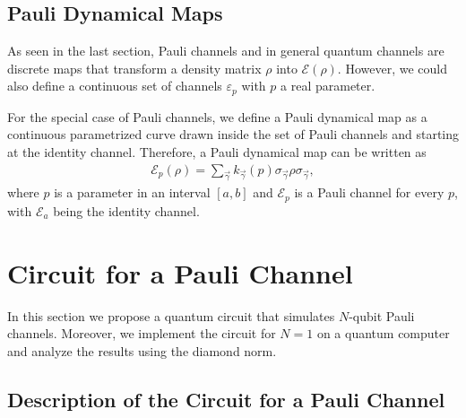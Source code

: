 \documentclass[10pt,letterpaper]{article} %
\begin{document}
\subsection{Pauli Dynamical Maps} %
\label{subsec: Pauli Dynamical Maps}


As seen in the last section, Pauli channels and in 
general quantum channels are discrete maps
that transform a density matrix $\rho$ into $\mathcal{E}(\rho)$.
However, we could also define a continuous set of 
channels $\varepsilon_p$ with $p$ a real parameter.

For the special case of Pauli channels, we define 
a Pauli dynamical map as a continuous parametrized 
curve drawn inside the set of Pauli channels and starting at the identity channel. 
Therefore, a Pauli dynamical map can be written as
\begin{eqnarray}
\label{eq: Pauli dynamical map}
\mathcal{E}_p(\rho) = \sum_{\vec{\gamma}} k_{\vec{\gamma}}(p) \sigma_{\vec{\gamma}} \rho \sigma_{\vec{\gamma}},
\end{eqnarray}
where $p$ is a parameter in an interval $[a,b]$ 
and $\mathcal{E}_p$ is a Pauli channel for every $p$, 
with $\mathcal{E}_a$ being the identity channel.

\section{Circuit for a Pauli Channel} %
\label{sec: Circuit for a Pauli Channel}

In this section we propose a quantum circuit that simulates $N$-qubit Pauli
channels.  Moreover, we implement the circuit for $N=1$ on a quantum computer
and analyze the results using the diamond norm.
 

\subsection{Description of the Circuit for a Pauli Channel} %
\label{subsec: Description of the circuit}



\end{document}
